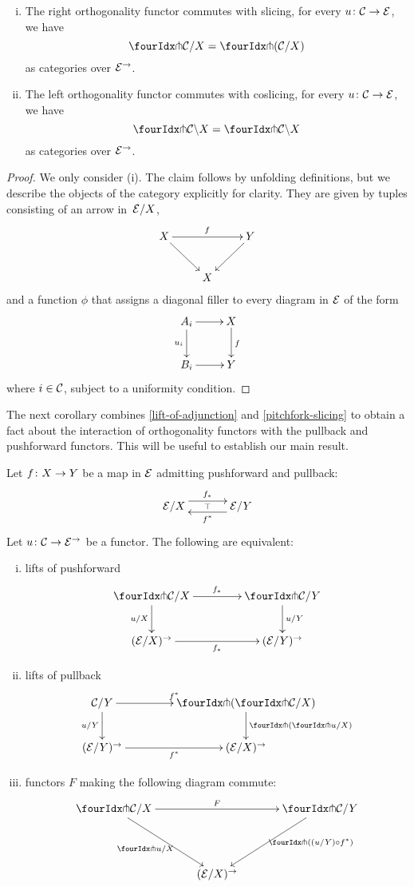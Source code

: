 \documentclass[reqno,10pt,a4paper,oneside]{amsart}
\begin{document}
\begin{proposition} \hfill 
\label{pitchfork-slicing}
\begin{enumerate}[(i)]
\item The right orthogonality functor commutes with slicing, \ie for every $u \co \cal{C} \to \cal{E}$, we have
\[
  \liftr{\cal{C}}/X = \liftr{(\cal{C}/X)}
\]
as categories over $\cal{E}^\to$.
\item The left orthogonality functor commutes with coslicing, \ie for every $u \co \cal{C} \to \cal{E}$, we have
\[
 \liftl{\cal{C}} \backslash X = \liftl{\cal{C} \backslash X}
\]
as categories over $\cal{E}^\to$.
\end{enumerate}
\end{proposition}

\begin{proof} We only consider (i). The claim follows by unfolding definitions, but we describe the objects of the category explicitly for clarity. They are given by 
tuples consisting of an arrow in~$\cal{E}/X$, 
\[
\xymatrix{
X \ar[dr] \ar[rr]^f  &  & Y \ar[dl] \\
 & X & }
 \]
and a function $\phi$ that assigns a diagonal filler to every diagram in $\cal{E}$ of the form
\[
\xymatrix{
A_i \ar[r] \ar[d]_{u_i} & X \ar[d]^{f} \\
B_i \ar[r] & Y}
\]
where $i \in \cal{C}$, subject to a uniformity condition. 
\end{proof}

The next corollary combines \cref{lift-of-adjunction} and \cref{pitchfork-slicing} to obtain 
a fact about the interaction of orthogonality functors with the pullback and pushforward
functors. This will be useful to establish our main result.

\begin{corollary}
\label{lift-dependent-product}
Let $f \co X \to Y$ be a map in $\catE$ admitting pushforward and pullback:
\[
\xymatrix@C+1em{
  \catE/X
  \ar@<5pt>[r]^{f_*}
  \ar@{}[r]|{\top}
&
  \catE/Y
  \ar@<5pt>[l]^{f^*}
}
\]
Let $u \co \cal{C} \to \catE^{\to}$ be a functor. The following are
equivalent:
\begin{enumerate}[(i)]
\item lifts of pushforward
\[
\xymatrix@C=1.5cm{
\liftr{\cal{C}}/X
\ar[r]^{f_*}
  \ar[d]_{u/X}
&
  \liftr{\cal{C}}/Y
  \ar[d]^{u/Y}
\\
  (\catE/X)^{\to}
   \ar[r]_{f_*}
&
  (\catE/Y)^{\to}
 }
\]
\item lifts of pullback
\[
\xymatrix@C=1.5cm{
  \cal{C}/Y
   \ar[r]^{f^*}
  \ar[d]_{u/Y} 
  &
  \liftl{ ( \liftr{\cal{C}}/X ) }
  \ar[d]^{\liftl{(\liftr{u}/X)}}
     \\
     (\catE/Y)^{\to} \ar[r]_{f^*} &
   (\catE/X)^{\to} 
}
\]
\item functors $F$ making the following diagram commute:
\[
\xymatrix@C=1.2cm@R=1.5cm{
\liftr{\cal{C}}/X \ar[rr]^F \ar[dr]_{\liftr{u}/X} & &  \liftr{\cal{C}}/ Y \ar[dl]^(.4){\ \liftr{( (u/Y) \cc f^*)}}  \\
 & (\cal{E}/X)^\to & }
\]
\end{enumerate}
\end{corollary}
\end{document}
